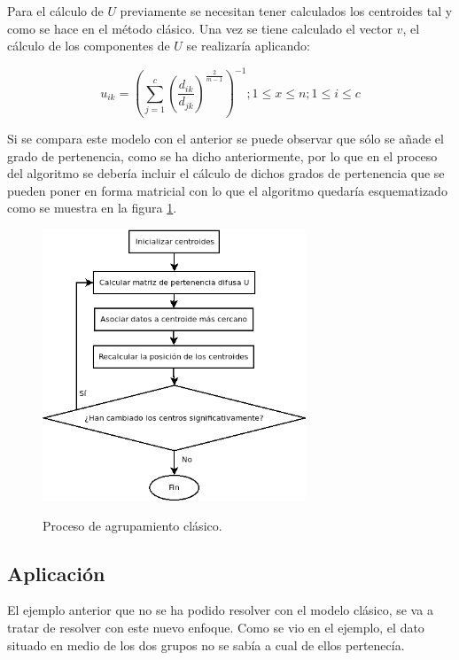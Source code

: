\documentclass[]{report}
\begin{document}
			Para el cálculo de $U$ previamente se necesitan tener calculados los centroides tal y como se hace en el método clásico. Una vez se tiene calculado el vector $v$, el cálculo de los componentes de $U$ se realizaría aplicando:
			
			$$u_{ik} = (\sum_{j=1}^c(\frac{d _{ik}}{d_{jk}})^{\frac{2}{m-1}})^{-1} ; 1 \leq x \leq n; 1\leq i \leq c $$
		
			Si se compara este modelo con el anterior se puede observar que sólo se añade el grado de pertenencia, como se ha dicho anteriormente, por lo que en el proceso del algoritmo se debería incluir el cálculo de dichos grados de pertenencia que se pueden poner en forma matricial con lo que el algoritmo quedaría esquematizado como se muestra en la figura \ref{agrupamiento_difuso}.
			
			\begin{figure}[h]
				\centering
				\includegraphics[width=0.7\textwidth]{agrupamiento-difuso.png}
				\label{agrupamiento_difuso}
				\caption{Proceso de agrupamiento clásico.}
			\end{figure}
		
			\subsection{Aplicación}
						
				El ejemplo anterior que no se ha podido resolver con el modelo clásico, se va a tratar de resolver con este nuevo enfoque. Como se vio en el ejemplo, el dato situado en medio de los dos grupos no se sabía a cual de ellos pertenecía.\\
				
\end{document}

